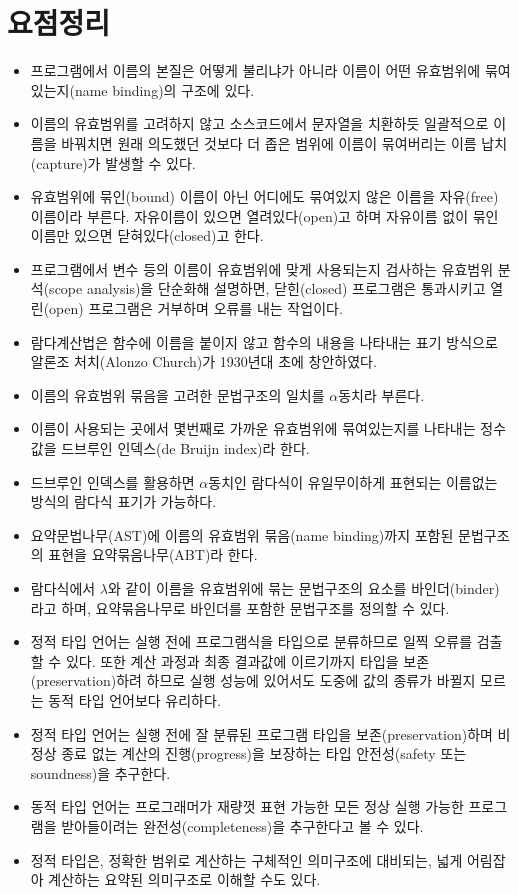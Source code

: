 \section*{요점정리}
\begin{itemize}[itemsep=0pt]
 \item 프로그램에서 이름의 본질은 어떻게 불리냐가 아니라 이름이
       어떤 유효범위에 묶여있는지(name binding)의 구조에 있다.
 \item 이름의 유효범위를 고려하지 않고 소스코드에서 문자열을 치환하듯
       일괄적으로 이름을 바꿔치면 원래 의도했던 것보다 더 좁은 범위에
       이름이 묶여버리는 이름 납치(capture)가 발생할 수 있다.
 \item 유효범위에 묶인(bound) 이름이 아닌 어디에도 묶여있지 않은 이름을
       자유(free)이름이라 부른다. 자유이름이 있으면 열려있다(open)고
       하며 자유이름 없이 묶인이름만 있으면 닫혀있다(closed)고 한다.
 \item 프로그램에서 변수 등의 이름이 유효범위에 맞게 사용되는지
       검사하는 유효범위 분석(scope analysis)을 단순화해 설명하면,
       닫힌(closed) 프로그램은 통과시키고 열린(open) 프로그램은
       거부하며 오류를 내는 작업이다.
 \item 람다계산법은 함수에 이름을 붙이지 않고 함수의 내용을 나타내는
       표기 방식으로 알론조 처치(Alonzo Church)가 1930년대 초에
       창안하였다.
 \item 이름의 유효범위 묶음을 고려한 문법구조의 일치를
       $\alpha$동치라 부른다.
 \item 이름이 사용되는 곳에서 몇번째로 가까운 유효범위에 묶여있는지를
       나타내는 정수값을 드브루인 인덱스(de Bruijn index)라 한다.
 \item 드브루인 인덱스를 활용하면 $\alpha$동치인 람다식이 유일무이하게
       표현되는 이름없는 방식의 람다식 표기가 가능하다.
 \item 요약문법나무(AST)에 이름의 유효범위 묶음(name binding)까지
       포함된 문법구조의 표현을 요약묶음나무(ABT)라 한다.
 \item 람다식에서 $\lambda$와 같이 이름을 유효범위에 묶는 문법구조의
       요소를 바인더(binder)라고 하며, 요약묶음나무로 바인더를
       포함한 문법구조를 정의할 수 있다.
 \item 정적 타입 언어는 실행 전에 프로그램식을 타입으로 분류하므로
       일찍 오류를 검출할 수 있다. 또한 계산 과정과 최종 결과값에
       이르기까지 타입을 보존(preservation)하려 하므로 실행 성능에
       있어서도 도중에 값의 종류가 바뀔지 모르는 동적 타입 언어보다
       유리하다.
 \item 정적 타입 언어는 실행 전에 잘 분류된 프로그램 타입을
       보존(preservation)하며 비정상 종료 없는 계산의 진행(progress)을
       보장하는 타입 안전성(safety 또는 soundness)을 추구한다.
 \item 동적 타입 언어는 프로그래머가 재량껏 표현 가능한 모든
       정상 실행 가능한 프로그램을 받아들이려는 완전성(completeness)을
       추구한다고 볼 수 있다.
 \item 정적 타입은, 정확한 범위로 계산하는 구체적인 의미구조에 대비되는,
       넓게 어림잡아 계산하는 요약된 의미구조로 이해할 수도 있다.
\end{itemize}

